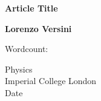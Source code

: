 

\begin{titlepage}
	\begin{center}
		\vspace*{1cm}
		
        \Huge
        \textbf{\color{astral}Article Title}
        
        \LARGE
        \vspace{0.5cm}
        \color{astral}{Article Subtitle}
        \color{black}
        \vspace{1.5cm}
        
        \textbf{Lorenzo Versini}
        
        
        \vfill
        Wordcount:  
        
        \Large
        Physics\\
        Imperial College London\\
        Date
        
	\end{center}
\end{titlepage}